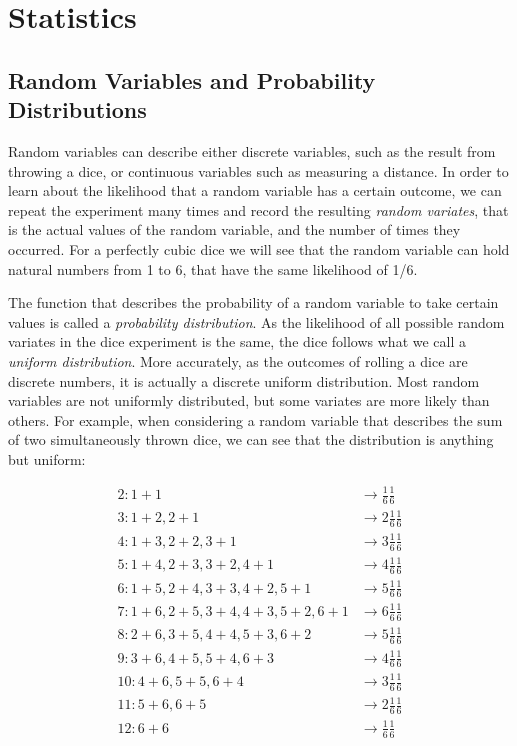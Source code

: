 \chapter{Statistics}\label{chap:statistics}
\section{Random Variables and Probability Distributions}\label{sec:pdfs}
Random variables can describe either discrete variables, such as the result from throwing a dice, or continuous variables such as measuring a distance. In order to learn about the likelihood that a random variable has a certain outcome, we can repeat the experiment many times and record the resulting \textsl{random variates}, that is the actual values of the random variable, and the number of times they occurred. For a perfectly cubic dice we will see that the random variable can hold natural numbers from 1 to 6, that have the same likelihood of 1/6.

The function that describes the probability of a random variable to take certain values is called a \textsl{probability distribution}.
As the likelihood of all possible random variates in the dice experiment is the same, the dice follows what we call a \textsl{uniform distribution}. More accurately, as the outcomes of rolling a dice are discrete numbers, it is actually a discrete uniform distribution. Most random variables are not uniformly distributed, but some variates are more likely than others. For example, when considering a random variable that describes the sum of two simultaneously thrown dice, we can see that the distribution is anything but uniform:

\begin{equation}\begin{array}{ll}
2: 1+1 & \rightarrow \frac{1}{6}\frac{1}{6}\\
3: 1+2, 2+1 &\rightarrow 2\frac{1}{6}\frac{1}{6}\\
4: 1+3, 2+2, 3+1 &\rightarrow 3\frac{1}{6}\frac{1}{6}\\
5: 1+4, 2+3, 3+2, 4+1 & \rightarrow 4\frac{1}{6}\frac{1}{6}\\
6: 1+5, 2+4, 3+3, 4+2, 5+1 & \rightarrow 5\frac{1}{6}\frac{1}{6}\\
7: 1+6, 2+5, 3+4, 4+3, 5+2, 6+1 & \rightarrow 6\frac{1}{6}\frac{1}{6}\\
8: 2+6, 3+5, 4+4, 5+3, 6+2 & \rightarrow 5\frac{1}{6}\frac{1}{6}\\
9: 3+6, 4+5, 5+4, 6+3 & \rightarrow 4\frac{1}{6}\frac{1}{6}\\
10: 4+6, 5+5, 6+4 & \rightarrow 3\frac{1}{6}\frac{1}{6}\\
11: 5+6, 6+5 & \rightarrow 2\frac{1}{6}\frac{1}{6}\\
12: 6+6 & \rightarrow \frac{1}{6}\frac{1}{6}\\
\end{array}\end{equation}

